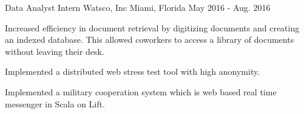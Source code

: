 \begin{cventries}
  \cventry
    {Data Analyst Intern} %
    {Watsco, Inc} %
    {Miami, Florida} %
    {May 2016 - Aug. 2016} %
    {
      \begin{cvitems} %
        \item {Increased efficiency in document retrieval by digitizing documents and creating an indexed database. This allowed coworkers to access a library of documents without leaving their desk.}
        \item {Implemented a distributed web stress test tool with high anonymity.}
        \item {Implemented a military cooperation system which is web based real time messenger in Scala on Lift.}
      \end{cvitems}
    }
    

\end{cventries}
